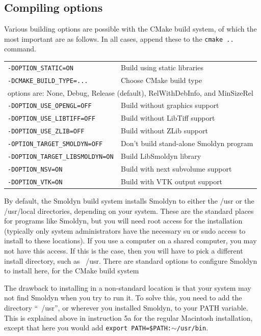 \documentclass {scrbook}
\newcommand {\ttt} {\texttt}
\begin{document}
\subsection*{Compiling options}

Various building options are possible with the CMake build system, of which the most important are as follows. In all cases, append these to the \ttt{cmake ..} command.

\begin{longtable}[c]{ll}
\ttt{-DOPTION\_STATIC=ON} & Build using static libraries\\
\ttt{-DCMAKE\_BUILD\_TYPE=...} & Choose CMake build type\\
\multicolumn{2}{l}{options are: None, Debug, Release (default), RelWithDebInfo, and MinSizeRel}\\
\ttt{-DOPTION\_USE\_OPENGL=OFF} & Build without graphics support\\
\ttt{-DOPTION\_USE\_LIBTIFF=OFF} & Build without LibTiff support\\
\ttt{-DOPTION\_USE\_ZLIB=OFF} & Build without ZLib support\\
\ttt{-OPTION\_TARGET\_SMOLDYN=OFF} & Don't build stand-alone Smoldyn program\\
\ttt{-DOPTION\_TARGET\_LIBSMOLDYN=ON} & Build LibSmoldyn library\\
\ttt{-DOPTION\_NSV=ON} & Build with next subvolume support\\
\ttt{-DOPTION\_VTK=ON} & Build with VTK output support\\
\end{longtable}

By default, the Smoldyn build system installs Smoldyn to either the /usr or the /usr/local directories, depending on your system. These are the standard places for programs like Smoldyn, but you will need root access for the installation (typically only system administrators have the necessary su or sudo access to install to these locations). If you use a computer on a shared computer, you may not have this access. If this is the case, then you will have to pick a different install directory, such as ~/usr. There are standard options to configure Smoldyn to install here, for the CMake build system

The drawback to installing in a non-standard location is that your system may not find Smoldyn when you try to run it. To solve this, you need to add the directory ``~/usr'', or wherever you installed Smoldyn, to your PATH variable. This is explained above in instruction 5a for the regular Macintosh installation, except that here you would add \ttt{export PATH=\$PATH:$\sim$/usr/bin}.
\end{document}

